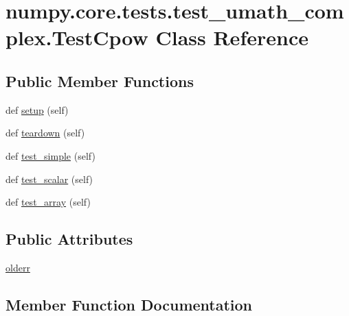 \hypertarget{classnumpy_1_1core_1_1tests_1_1test__umath__complex_1_1TestCpow}{}\section{numpy.\+core.\+tests.\+test\+\_\+umath\+\_\+complex.\+Test\+Cpow Class Reference}
\label{classnumpy_1_1core_1_1tests_1_1test__umath__complex_1_1TestCpow}
\subsection*{Public Member Functions}
\begin{DoxyCompactItemize}
\item 
def \hyperlink{classnumpy_1_1core_1_1tests_1_1test__umath__complex_1_1TestCpow_a966b8ad2c1bfccd85e64e4f2b908e73e}{setup} (self)
\item 
def \hyperlink{classnumpy_1_1core_1_1tests_1_1test__umath__complex_1_1TestCpow_a7483dee69e0d7542108b9fc27072bd23}{teardown} (self)
\item 
def \hyperlink{classnumpy_1_1core_1_1tests_1_1test__umath__complex_1_1TestCpow_ae76472d688f2d2b50c9049d3a7a8a131}{test\+\_\+simple} (self)
\item 
def \hyperlink{classnumpy_1_1core_1_1tests_1_1test__umath__complex_1_1TestCpow_afc97b466a79b88df35bc65714eff567f}{test\+\_\+scalar} (self)
\item 
def \hyperlink{classnumpy_1_1core_1_1tests_1_1test__umath__complex_1_1TestCpow_a6c4b40b92c0a8dab0d981cb606a32e31}{test\+\_\+array} (self)
\end{DoxyCompactItemize}
\subsection*{Public Attributes}
\begin{DoxyCompactItemize}
\item 
\hyperlink{classnumpy_1_1core_1_1tests_1_1test__umath__complex_1_1TestCpow_a6861bb488f820ef0643e47057bb3c41b}{olderr}
\end{DoxyCompactItemize}


\subsection{Member Function Documentation}
\mbox{\label{classnumpy_1_1core_1_1tests_1_1test__umath__complex_1_1TestCpow_a966b8ad2c1bfccd85e64e4f2b908e73e}} 
